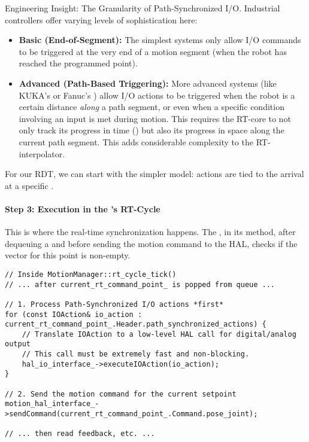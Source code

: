 \begin{principlebox}{Engineering Insight: The Granularity of Path-Synchronized I/O.}
    Industrial controllers offer varying levels of sophistication here:
    \begin{itemize}
        \item \textbf{Basic (End-of-Segment):} The simplest systems only allow I/O commands to be triggered at the very end of a motion segment (when the robot has reached the programmed point).
        \item \textbf{Advanced (Path-Based Triggering):} More advanced systems (like KUKA's  or Fanuc's ) allow I/O actions to be triggered when the robot is a certain distance \textit{along} a path segment, or even when a specific condition involving an input is met during motion. This requires the RT-core to not only track its progress in time () but also its progress in space along the current path segment. This adds considerable complexity to the RT-interpolator.
    \end{itemize}
    For our RDT, we can start with the simpler model: actions are tied to the arrival at a specific .
\end{principlebox}

\paragraph{Step 3: Execution in the 's RT-Cycle}
This is where the real-time synchronization happens. The , in its  method, after dequeuing a  and before sending the motion command to the HAL, checks if the  vector for this point is non-empty.

\begin{verbatim}
// Inside MotionManager::rt_cycle_tick()
// ... after current_rt_command_point_ is popped from queue ...

// 1. Process Path-Synchronized I/O actions *first*
for (const IOAction& io_action : current_rt_command_point_.Header.path_synchronized_actions) {
    // Translate IOAction to a low-level HAL call for digital/analog output
    // This call must be extremely fast and non-blocking.
    hal_io_interface_->executeIOAction(io_action); 
}

// 2. Send the motion command for the current setpoint
motion_hal_interface_->sendCommand(current_rt_command_point_.Command.pose_joint);

// ... then read feedback, etc. ...
\end{verbatim}
\label{lst:rt-path-sync-io}

